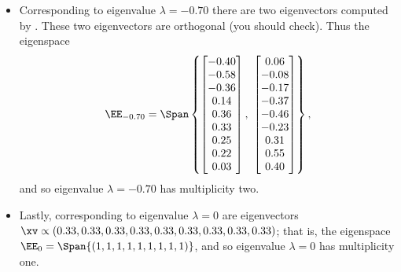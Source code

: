 \begin{example}
\begin{solution}
\begin{itemize}
\item Corresponding to eigenvalue \(\lambda=-0.70\) there are two eigenvectors computed by \script.
These two eigenvectors are orthogonal (you should check).
Thus the eigenspace
\begin{equation*}
\EE_{-0.70}=\Span\left\{ \begin{bmatrix} -0.40\\-0.58\\-0.36\\0.14\\0.36\\0.33\\0.25\\0.22\\0.03 \end{bmatrix},\  \begin{bmatrix} 0.06\\-0.08\\-0.17\\-0.37\\-0.46\\-0.23\\0.31\\0.55\\0.40 \end{bmatrix} \right\},
\end{equation*}
and so eigenvalue \(\lambda=-0.70\) has multiplicity two.

\item Lastly, corresponding to eigenvalue \(\lambda=0\) are eigenvectors \(\xv\propto(0.33,0.33,0.33,0.33,0.33,0.33,0.33,0.33,0.33)\); 
that is, the eigenspace \(\EE_{0}=\Span\{(1,1,1,1,1,1,1,1,1)\}\),
and so eigenvalue \(\lambda=0\) has multiplicity one.


\end{itemize}
\end{solution}
\end{example}
